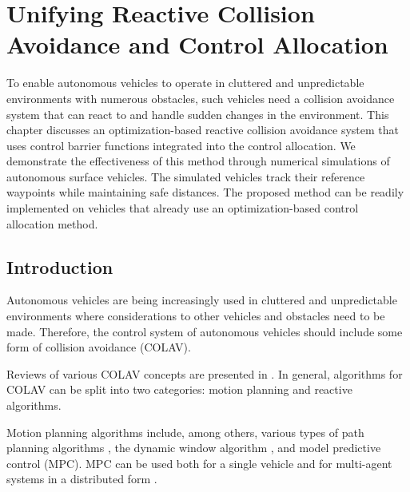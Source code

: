 \chapter{Unifying Reactive Collision Avoidance and Control Allocation}
\label{chap:collision_avoidance}

To enable autonomous vehicles to operate in cluttered and unpredictable environments with numerous obstacles, such vehicles need a collision avoidance system that can react to and handle sudden changes in the environment.
This chapter discusses an optimization-based reactive collision avoidance system that uses control barrier functions integrated into the control allocation.
We demonstrate the effectiveness of this method through numerical simulations of autonomous surface vehicles. The simulated vehicles track their reference waypoints while maintaining safe distances.
The proposed method can be readily implemented on vehicles that already use an optimization-based control allocation method.

\section{Introduction}
Autonomous vehicles are being increasingly used in cluttered and unpredictable environments where considerations to other vehicles and obstacles need to be made. 
Therefore, the control system of autonomous vehicles should include some form of collision avoidance (COLAV).

Reviews of various COLAV concepts are presented in \cite{statheros_autonomous_2008,tam_review_2009,hoy_algorithms_2015}.
In general, algorithms for COLAV can be split into two categories: motion planning and reactive algorithms.

Motion planning algorithms include, among others, various types of path planning algorithms \cite{wang_ship_2017,kuwata_safe_2014,lazarowska_ships_2015}, the dynamic window algorithm \cite{fox_dynamic_1997}, and model predictive control (MPC).
MPC can be used both for a single vehicle \cite{hagen_mpc-based_2018,sun_collision_2018} and for multi-agent systems in a distributed form \cite{kuriki_formation_2015,dai_distributed_2017}.

